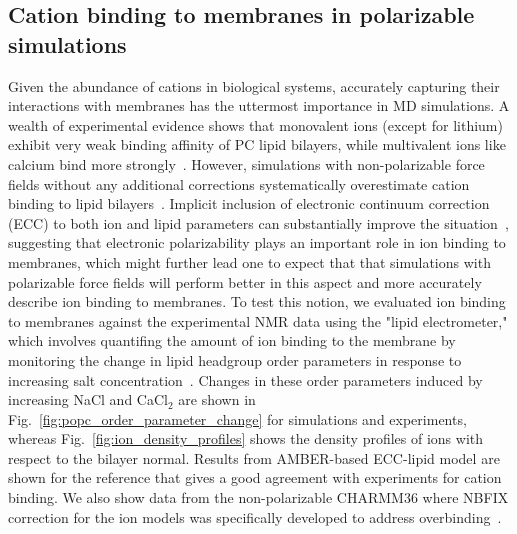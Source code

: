 \documentclass[journal=jacsat,manuscript=article,layout=singlecolumn]{achemso}
\begin{document}
\subsection{Cation binding to membranes in polarizable simulations}

Given the abundance of cations in biological systems, accurately capturing their interactions with membranes has the uttermost importance in MD simulations. A wealth of  experimental evidence shows that monovalent ions (except for lithium) exhibit very weak binding affinity of PC lipid bilayers, while multivalent ions like calcium bind more strongly~\cite{Catte2016}. However, simulations with non-polarizable force fields without any additional corrections systematically overestimate cation binding to lipid bilayers~\cite{Catte2016}. Implicit inclusion of electronic continuum correction (ECC) to both ion and lipid parameters can substantially improve the situation~\cite{Melcr:2018a,melcr2019improved,bacle21}, suggesting that electronic polarizability plays an important role in ion binding to membranes, which might further lead one to expect that that simulations with polarizable force fields will perform better in this aspect and more accurately describe ion binding to membranes.
To test this notion, we evaluated ion binding to membranes against the experimental NMR data using the "lipid electrometer," which involves quantifing the amount of ion binding to the membrane by monitoring the change in lipid headgroup order parameters in response to increasing salt concentration~\cite{Catte2016}. Changes in these order parameters induced by increasing NaCl and CaCl$_2$ are shown in Fig.~\ref{fig:popc_order_parameter_change} for simulations and experiments, whereas Fig.~\ref{fig:ion_density_profiles} shows the density profiles of ions with respect to the bilayer normal. Results from AMBER-based ECC-lipid model are shown for the reference that gives a good agreement with experiments for cation binding. We also show data from the non-polarizable CHARMM36 where NBFIX correction for the ion models was specifically developed to address overbinding~\cite{Venable2013,Han2018}.
\end{document}
